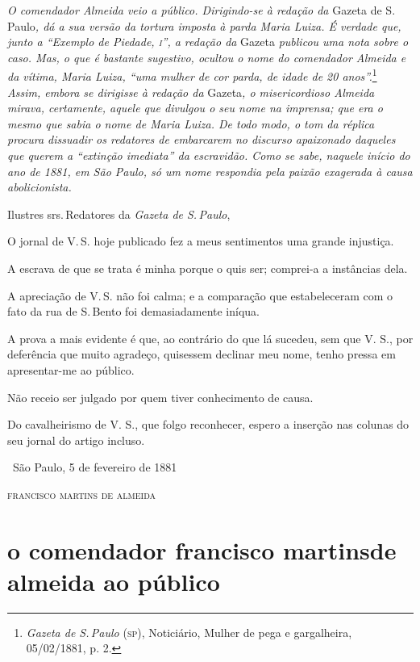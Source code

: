 \begin{resumo}
\emph{O comendador Almeida veio a público. Dirigindo-se à redação da}
Gazeta de S.\,Paulo\emph{, dá a sua versão da tortura imposta à parda
Maria Luiza. É verdade que, junto a ``Exemplo de Piedade, \textsc{i}'', a
redação da} Gazeta \emph{publicou uma nota sobre o caso. Mas, o que é
bastante sugestivo, ocultou o nome do comendador Almeida e da vítima,
Maria Luiza, ``uma mulher de cor parda, de idade de 20 anos''.}\footnote{
\emph{Gazeta de S.\,Paulo} (\textsc{sp}), Noticiário, Mulher de pega e
  gargalheira, 05/02/1881, p. 2.}
\emph{Assim, embora se
dirigisse à redação da} Gazeta\emph{, o misericordioso Almeida mirava,
certamente, aquele que divulgou o seu nome na imprensa; que era o mesmo
que sabia o nome de Maria Luiza. De todo modo, o tom da réplica procura
dissuadir os redatores de embarcarem no discurso apaixonado daqueles que
querem a ``extinção imediata'' da escravidão. Como se sabe, naquele início
do ano de 1881, em São Paulo, só um nome respondia pela paixão exagerada
à causa abolicionista. }
\end{resumo}

Ilustres srs.\,Redatores da \emph{Gazeta de S.\,Paulo},

O jornal de V.\,S. hoje publicado fez a meus sentimentos uma grande
injustiça.

A escrava de que se trata é minha porque o quis ser; comprei-a a
instâncias dela.

A apreciação de V.\,S. não foi calma; e a comparação que estabeleceram
com o fato da rua de S.\,Bento foi demasiadamente iníqua.

A prova a mais evidente é que, ao contrário do que lá sucedeu, sem que
V. S., por deferência que muito agradeço, quisessem declinar meu nome,
tenho pressa em apresentar-me ao público.

Não receio ser julgado por quem tiver conhecimento de causa.

Do cavalheirismo de V. S., que folgo reconhecer, espero a inserção nas
colunas do seu jornal do artigo incluso.

\medskip
\hfill\ São Paulo, 5 de fevereiro de 1881

\hfill\textsc{francisco martins de almeida}

\section*{o comendador francisco martins\break de almeida ao público}

